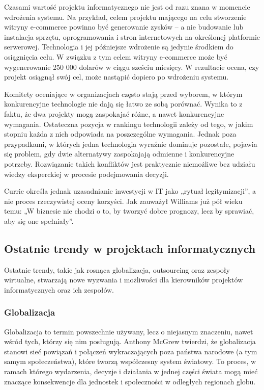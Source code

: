 Czasami wartość projektu informatycznego nie jest od razu znana w momencie wdrożenia systemu. Na przykład, celem projektu mającego na celu stworzenie witryny e-commerce powinno być generowanie zysków – a nie budowanie lub instalacja sprzętu, oprogramowania i stron internetowych na określonej platformie serwerowej. Technologia i jej późniejsze wdrożenie są jedynie środkiem do osiągnięcia celu. W związku z tym celem witryny e-commerce może być wygenerowanie 250 000 dolarów w ciągu sześciu miesięcy. W rezultacie ocena, czy projekt osiągnął swój cel, może nastąpić dopiero po wdrożeniu systemu. \autocite{ITPMMarchewka}

Komitety oceniające w organizacjach często stają przed wyborem, w którym konkurencyjne technologie nie dają się łatwo ze sobą porównać. Wynika to z faktu, że dwa projekty mogą zaspokajać różne, a nawet konkurencyjne wymagania. Ostateczna pozycja w rankingu technologii zależy od tego, w jakim stopniu każda z nich odpowiada na poszczególne wymagania. Jednak poza przypadkami, w których jedna technologia wyraźnie dominuje pozostałe, pojawia się problem, gdy dwie alternatywy zaspokajają odmienne i konkurencyjne potrzeby. Rozwiązanie takich konfliktów jest praktycznie niemożliwe bez udziału wiedzy eksperckiej w procesie podejmowania decyzji. \autocite{thomaidis2006evaluation}

Currie określa jednak uzasadnianie inwestycji w IT jako „rytuał legitymizacji”, a nie proces rzeczywistej oceny korzyści. \autocite{Currie1989} Jak zauważył Williams już pół wieku temu: „W biznesie nie chodzi o to, by tworzyć dobre prognozy, lecz by sprawiać, aby się one spełniały”. \autocite{williams1967technology}

\subsection{Ostatnie trendy w projektach informatycznych}
Ostatnie trendy, takie jak rosnąca globalizacja, outsourcing oraz zespoły wirtualne, stwarzają nowe wyzwania i możliwości dla kierowników projektów informatycznych oraz ich zespołów. \autocite{ITPM}

\subsubsection{Globalizacja}
Globalizacja to termin powszechnie używany, lecz o niejasnym znaczeniu, nawet wśród tych, którzy się nim posługują. \autocite{robertson2007globalization} Anthony McGrew twierdzi, że globalizacja stanowi sieć powiązań i połączeń wykraczających poza państwa narodowe (a tym samym społeczeństwa), które tworzą współczesny system światowy. To proces, w ramach którego wydarzenia, decyzje i działania w jednej części świata mogą mieć znaczące konsekwencje dla jednostek i społeczności w odległych regionach globu. \autocite{McGrew1990}

